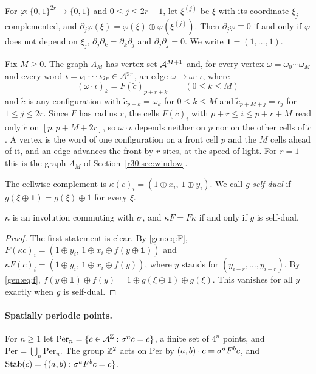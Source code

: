 For $\varphi\colon\{0,1\}^{2r}\to\{0,1\}$ and $0\le j\le 2r-1$, let $\xi^{(j)}$ be $\xi$ with its coordinate $\xi_j$ complemented, and $\partial_j\varphi(\xi)=\varphi(\xi)\oplus\varphi(\xi^{(j)})$. Then $\partial_j\varphi\equiv0$ if and only if $\varphi$ does not depend on $\xi_j$, $\partial_j\partial_k=\partial_k\partial_j$ and $\partial_j\partial_j=0$. We write $\mathbf 1=(1,\dots,1)$.

\begin{definition}\label{gen:def:lambda}
Fix $M\ge0$. The graph $\Lambda_M$ has vertex set $\mathcal{A}^{M+1}$ and, for every vertex $\omega=\omega_0\cdots\omega_M$ and every word $\iota=\iota_1\cdots\iota_{2r}\in\mathcal{A}^{2r}$, an edge $\omega\to\omega\cdot\iota$, where
\[
(\omega\cdot\iota)_k=F(\tilde c)_{p+r+k}\qquad(0\le k\le M)
\]
and $\tilde c$ is any configuration with $\tilde c_{p+k}=\omega_k$ for $0\le k\le M$ and $\tilde c_{p+M+j}=\iota_j$ for $1\le j\le 2r$. Since $F$ has radius $r$, the cells $F(\tilde c)_i$ with $p+r\le i\le p+r+M$ read only $\tilde c$ on $[p,p+M+2r]$, so $\omega\cdot\iota$ depends neither on $p$ nor on the other cells of $\tilde c$. A vertex is the word of one configuration on a front cell $p$ and the $M$ cells ahead of it, and an edge advances the front by $r$ sites, at the speed of light. For $r=1$ this is the graph $\Lambda_M$ of Section~\ref{r30:sec:window}.
\end{definition}

The cellwise complement is $\kappa(c)_i=(1\oplus x_i,\,1\oplus y_i)$. We call $g$ \emph{self-dual} if $g(\xi\oplus\mathbf 1)=g(\xi)\oplus1$ for every $\xi$.

\begin{lemma}\label{gen:lem:kappa}
$\kappa$ is an involution commuting with $\sigma$, and $\kappa F=F\kappa$ if and only if $g$ is self-dual.
\end{lemma}

\begin{proof}
The first statement is clear. By \eqref{gen:eq:F}, $F(\kappa c)_i=(1\oplus y_i,\,1\oplus x_i\oplus f(y\oplus\mathbf 1))$ and $\kappa F(c)_i=(1\oplus y_i,\,1\oplus x_i\oplus f(y))$, where $y$ stands for $(y_{i-r},\dots,y_{i+r})$. By \eqref{gen:eq:f}, $f(y\oplus\mathbf 1)\oplus f(y)=1\oplus g(\xi\oplus\mathbf 1)\oplus g(\xi)$. This vanishes for all $y$ exactly when $g$ is self-dual.
\end{proof}

\paragraph{Spatially periodic points.} For $n\ge1$ let $\mathrm{Per}_n=\{c\in\mathcal{A}^{\mathbb{Z}}:\sigma^nc=c\}$, a finite set of $4^n$ points, and $\mathrm{Per}=\bigcup_n\mathrm{Per}_n$. The group $\mathbb{Z}^2$ acts on $\mathrm{Per}$ by $(a,b)\cdot c=\sigma^aF^bc$, and $\mathrm{Stab}(c)=\{(a,b):\sigma^aF^bc=c\}$.

